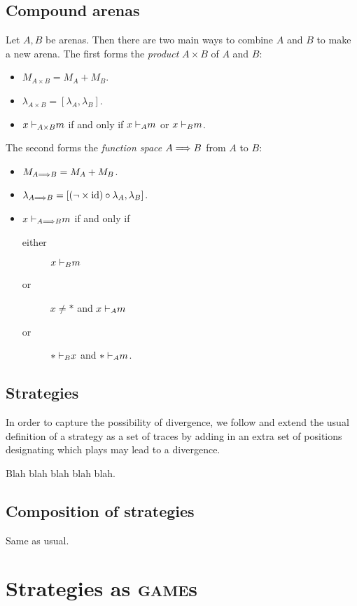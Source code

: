 \documentclass{article}
\newcommand{\game}{\textsc{game}}
\begin{document}
\subsection{Compound arenas}

Let $A,B$ be arenas.  
Then there are two main ways to combine $A$ and $B$ to make a new arena.  
The first forms the \emph{product} $A\times B$ of $A$ and $B$:
\begin{itemize}
  \item $M_{A\times B} = M_A + M_B$.
  \item $\lambda_{A\times B} = [\lambda_A, \lambda_B]$.  
  \item $x{\;\vdash}_{A\times B} m$ if and only if $x{\;\vdash}_A m$ or $x{\;\vdash}_B m$.
\end{itemize}
The second forms the \emph{function space} $A \Longrightarrow B$ from $A$ to $B$:
\begin{itemize}
  \item $M_{A\Longrightarrow B} = M_A + M_B$.
  \item $\lambda_{A\Longrightarrow B} = [(\neg\times\operatorname{id})\circ\lambda_A,\lambda_B]$.  
  \item $x{\;\vdash}_{A\Longrightarrow B} m$ if and only if
    \begin{description}
      \item[either] $x{\;\vdash}_B m$
      \item[or] $x\ne *$ and $x{\;\vdash}_A m$
      \item[or] $*{\;\vdash}_B x$ and $*{\;\vdash}_A m$.
    \end{description}
\end{itemize}

\subsection{Strategies}

In order to capture the possibility of divergence, we follow \cite{mcCHFiniteND} and extend the usual definition of a strategy as a set of traces by adding in an extra set of positions designating which plays may lead to a divergence.  

Blah blah blah blah blah.

\subsection{Composition of strategies}

Same as usual.

\section{Strategies as \game{}s}
\end{document}
